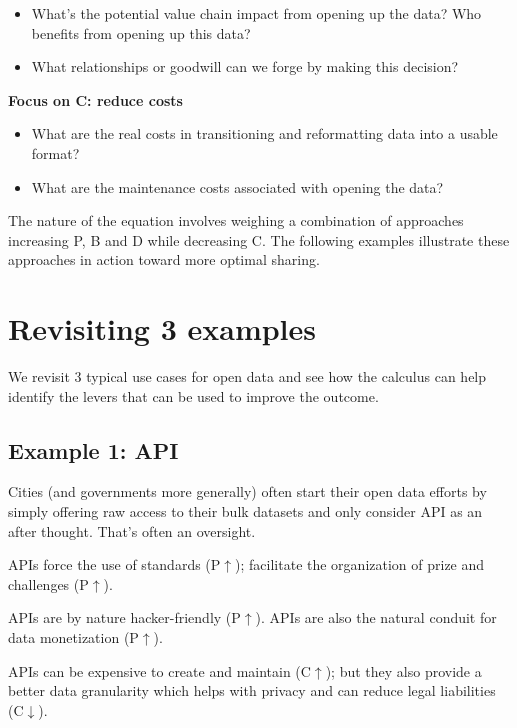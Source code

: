\documentclass[]{acm_proc_article-sp}
\begin{document}
\begin{itemize}
\itemsep1pt\parskip0pt
\item
  What's the potential value chain impact from opening up the data? Who
  benefits from opening up this data?
\item
  What relationships or goodwill can we forge by making this decision?
\end{itemize}

\textbf{Focus on C: reduce costs} \vspace{0mm}

\begin{itemize}
\itemsep1pt\parskip0pt
\item
  What are the real costs in transitioning and reformatting data into a
  usable format?
\item
  What are the maintenance costs associated with opening the data?
\end{itemize}

The nature of the equation involves weighing a combination of approaches
increasing P, B and D while decreasing C. The following examples
illustrate these approaches in action toward more optimal sharing.

\section{Revisiting 3 examples}\label{revisiting-3-examples}

We revisit 3 typical use cases for open data and see how the calculus
can help identify the levers that can be used to improve the outcome.

\subsection{Example 1: API}\label{example-1-api}

Cities (and governments more generally) often start their open data
efforts by simply offering raw access to their bulk datasets and only
consider API as an after thought. That's often an oversight.

APIs force the use of standards (P\(\uparrow\)); facilitate the
organization of prize and challenges (P\(\uparrow\)).

APIs are by nature hacker-friendly (P\(\uparrow\)). APIs are also the
natural conduit for data monetization (P\(\uparrow\)).

APIs can be expensive to create and maintain (C\(\uparrow\)); but they
also provide a better data granularity which helps with privacy and can
reduce legal liabilities (C\(\downarrow\)).
\end{document}
